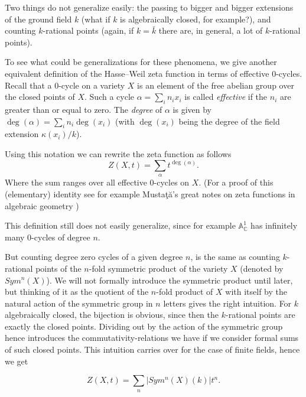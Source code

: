 \documentclass[11pt, a4paper, german]{article}
\theoremstyle{plain}
\theoremstyle{definition}
\begin{document}
Two things do not generalize easily: the passing to bigger and bigger extensions of the ground field $k$ (what if $k$ is algebraically closed,
for example?), and counting $k$-rational points (again, if $k = \bar{k}$ there are, in general, a lot of $k$-rational points). 

To see what could be generalizations for these phenomena, 
we give another equivalent definition of the Hasse--Weil zeta function in terms of effective 0-cycles. 
Recall that a 0-cycle on a variety $X$ is an element of the free abelian group over the closed 
points of $X$. Such a cycle $\alpha = \sum_i n_i x_i$ is called \emph{effective} if the $n_i$ are greater than or equal to zero.
The \emph{degree} of $\alpha$ is given by $\deg(\alpha) = \sum_i n_i \deg(x_i)$ 
(with $\deg(x_i)$ being the degree of the field extension $\kappa(x_i)/k$).

Using this notation we can rewrite the zeta function as follows 
\begin{equation}
    Z(X,t) = \sum_{\alpha} t^{\deg(\alpha)}.
\end{equation}
Where the sum ranges over all effective 0-cycles on $X$.
(For a proof of this (elementary) identity see for example Musta\c{t}\u{a}'s great notes on zeta functions in algebraic geometry 
\cite[Rem. 2.9]{mustata})

This definition still does not easily generalize, since for example $\mathbb{A}_{\mathbb{C}}^1$ has infinitely many 0-cycles of degree $n$.

But counting degree zero cycles of a given degree $n$, is the same as counting $k$-rational points of the $n$-fold symmetric product of the 
variety $X$ (denoted by $Sym^n(X)$).
We will not formally introduce the symmetric product until later, but thinking of it as the quotient of 
the $n$-fold product of $X$ with itself by the natural action of the symmetric group in $n$ letters gives the right intuition. 
For $k$ algebraically closed, the bijection is obvious, since then the $k$-rational points are exactly the closed points. 
Dividing out by the action of the symmetric group hence introduces the commutativity-relations we have if we consider formal sums
of such closed points. This intuition carries over for the case of finite fields, hence we get

\begin{equation}
    Z(X,t) = \sum_{n} |Sym^n(X)(k)| t^n.
\end{equation}
\end{document}
